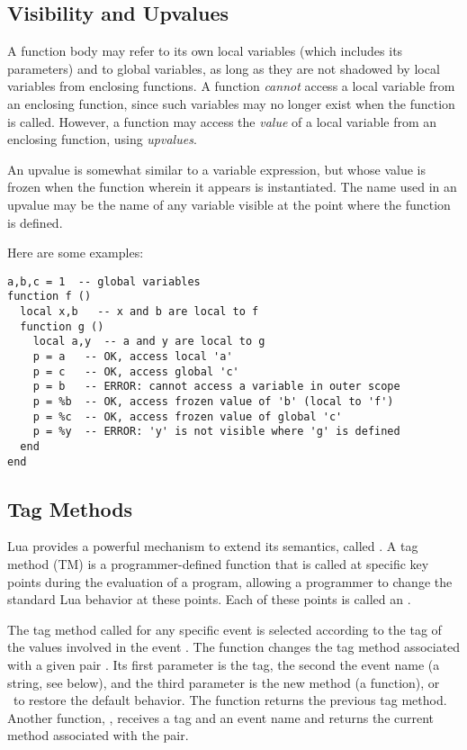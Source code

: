 \subsection{Visibility and Upvalues} \label{upvalue}
 

A function body may refer to its own local variables
(which includes its parameters) and to global variables,
as long as they are not shadowed by local
variables from enclosing functions.
A function \emph{cannot} access a local
variable from an enclosing function,
since such variables may no longer exist when the function is called.
However, a function may access the \emph{value} of a local variable
from an enclosing function, using \emph{upvalues}.

\begin{Produc}
\end{Produc}
An upvalue is somewhat similar to a variable expression,
but whose value is frozen when the function wherein it
appears is instantiated.
The name used in an upvalue may be the name of any variable visible
at the point where the function is defined.

Here are some examples:
\begin{verbatim}
a,b,c = 1  -- global variables
function f ()
  local x,b   -- x and b are local to f
  function g ()
    local a,y  -- a and y are local to g
    p = a   -- OK, access local 'a'
    p = c   -- OK, access global 'c'
    p = b   -- ERROR: cannot access a variable in outer scope
    p = %b  -- OK, access frozen value of 'b' (local to 'f')
    p = %c  -- OK, access frozen value of global 'c'
    p = %y  -- ERROR: 'y' is not visible where 'g' is defined
  end
end
\end{verbatim}


\subsection{Tag Methods} \label{tag-method}

Lua provides a powerful mechanism to extend its semantics,
called .
A tag method (TM) is a programmer-defined function
that is called at specific key points during the evaluation of a program,
allowing a programmer to change the standard Lua behavior at these points.
Each of these points is called an .

The tag method called for any specific event is selected
according to the tag of the values involved
in the event .
The function  changes the tag method
associated with a given pair .
Its first parameter is the tag, the second the event name
(a string, see below),
and the third parameter is the new method (a function),
or \nil\ to restore the default behavior.
The function returns the previous tag method.
Another function, ,
receives a tag and an event name and returns the
current method associated with the pair.

